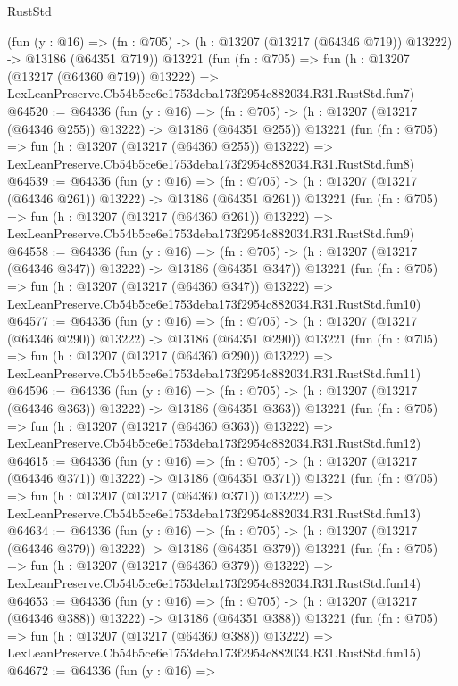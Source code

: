 \begin{lexlean}{RustStd}
\begin{coremodule}
    (fun (y : @16) =>
    (fn : @705) -> (h : @13207 (@13217 (@64346 @719)) @13222) -> @13186 (@64351 @719))
    @13221
    (fun (fn : @705) =>
    fun (h : @13207 (@13217 (@64360 @719)) @13222) =>
    LexLeanPreserve.Cb54b5ce6e1753deba173f2954c882034.R31.RustStd.fun7)
@64520 := @64336
    (fun (y : @16) =>
    (fn : @705) -> (h : @13207 (@13217 (@64346 @255)) @13222) -> @13186 (@64351 @255))
    @13221
    (fun (fn : @705) =>
    fun (h : @13207 (@13217 (@64360 @255)) @13222) =>
    LexLeanPreserve.Cb54b5ce6e1753deba173f2954c882034.R31.RustStd.fun8)
@64539 := @64336
    (fun (y : @16) =>
    (fn : @705) -> (h : @13207 (@13217 (@64346 @261)) @13222) -> @13186 (@64351 @261))
    @13221
    (fun (fn : @705) =>
    fun (h : @13207 (@13217 (@64360 @261)) @13222) =>
    LexLeanPreserve.Cb54b5ce6e1753deba173f2954c882034.R31.RustStd.fun9)
@64558 := @64336
    (fun (y : @16) =>
    (fn : @705) -> (h : @13207 (@13217 (@64346 @347)) @13222) -> @13186 (@64351 @347))
    @13221
    (fun (fn : @705) =>
    fun (h : @13207 (@13217 (@64360 @347)) @13222) =>
    LexLeanPreserve.Cb54b5ce6e1753deba173f2954c882034.R31.RustStd.fun10)
@64577 := @64336
    (fun (y : @16) =>
    (fn : @705) -> (h : @13207 (@13217 (@64346 @290)) @13222) -> @13186 (@64351 @290))
    @13221
    (fun (fn : @705) =>
    fun (h : @13207 (@13217 (@64360 @290)) @13222) =>
    LexLeanPreserve.Cb54b5ce6e1753deba173f2954c882034.R31.RustStd.fun11)
@64596 := @64336
    (fun (y : @16) =>
    (fn : @705) -> (h : @13207 (@13217 (@64346 @363)) @13222) -> @13186 (@64351 @363))
    @13221
    (fun (fn : @705) =>
    fun (h : @13207 (@13217 (@64360 @363)) @13222) =>
    LexLeanPreserve.Cb54b5ce6e1753deba173f2954c882034.R31.RustStd.fun12)
@64615 := @64336
    (fun (y : @16) =>
    (fn : @705) -> (h : @13207 (@13217 (@64346 @371)) @13222) -> @13186 (@64351 @371))
    @13221
    (fun (fn : @705) =>
    fun (h : @13207 (@13217 (@64360 @371)) @13222) =>
    LexLeanPreserve.Cb54b5ce6e1753deba173f2954c882034.R31.RustStd.fun13)
@64634 := @64336
    (fun (y : @16) =>
    (fn : @705) -> (h : @13207 (@13217 (@64346 @379)) @13222) -> @13186 (@64351 @379))
    @13221
    (fun (fn : @705) =>
    fun (h : @13207 (@13217 (@64360 @379)) @13222) =>
    LexLeanPreserve.Cb54b5ce6e1753deba173f2954c882034.R31.RustStd.fun14)
@64653 := @64336
    (fun (y : @16) =>
    (fn : @705) -> (h : @13207 (@13217 (@64346 @388)) @13222) -> @13186 (@64351 @388))
    @13221
    (fun (fn : @705) =>
    fun (h : @13207 (@13217 (@64360 @388)) @13222) =>
    LexLeanPreserve.Cb54b5ce6e1753deba173f2954c882034.R31.RustStd.fun15)
@64672 := @64336
    (fun (y : @16) =>

\end{coremodule}
\end{lexlean}
